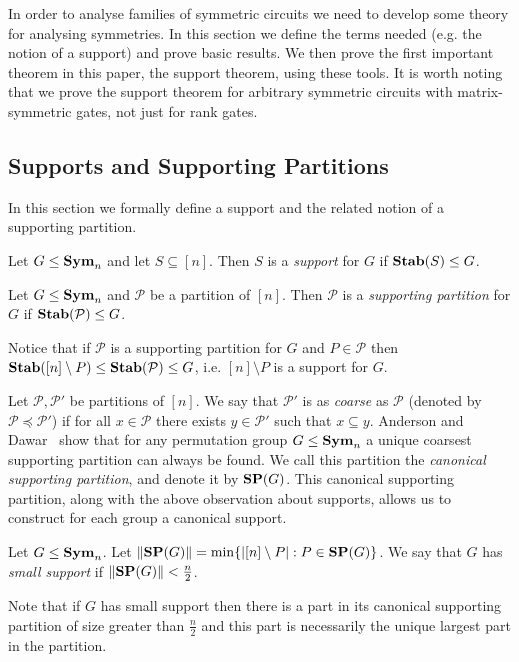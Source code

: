\documentclass[../paper.tex]{subfiles}
\begin{document}
In order to analyse families of symmetric circuits we need to develop some
theory for analysing symmetries. In this section we define the terms needed
(e.g. the notion of a support) and prove basic results. We then prove the first
important theorem in this paper, the support theorem, using these tools. It is
worth noting that we prove the support theorem for arbitrary symmetric circuits
with matrix-symmetric gates, not just for rank gates.

\subsection{Supports and Supporting Partitions}
In this section we formally define a support and the related notion of a
supporting partition.

\begin{definition}
  Let $G \leq \text{\textbf{Sym}}_n$ and let $S \subseteq [n]$. Then $S$ is a \emph{support}
  for $G$ if $\text{\textbf{Stab}}(S) \leq G$.
\end{definition}

\begin{definition}
  Let $G \leq \text{\textbf{Sym}}_n$ and $\mathcal{P}$ be a partition of $[n]$. Then
  $\mathcal{P}$ is a \emph{supporting partition} for $G$ if $\text{\textbf{Stab}}(\mathcal{P})
  \leq G$.
\end{definition}

Notice that if $\mathcal{P}$ is a supporting partition for $G$ and $P \in
\mathcal{P}$ then $\text{\textbf{Stab}}([n] \setminus P) \leq \text{\textbf{Stab}}(\mathcal{P}) \leq
G$, i.e. $[n] \setminus P$ is a support for $G$.

Let $\mathcal{P}, \mathcal{P}'$ be partitions of $[n]$.  We say that $\mathcal{P}'$ is as
\emph{coarse} as $\mathcal{P}$ (denoted by $\mathcal{P} \preceq \mathcal{P}'$)
if for all $x \in \mathcal{P}$ there exists $y \in \mathcal{P}'$ such that $x
\subseteq y$.
Anderson and Dawar~\cite{AndersonD17} show that for any permutation group $G
\leq \text{\textbf{Sym}}_n$ a unique coarsest supporting partition can always be found.  We call this
partition the \emph{canonical supporting partition}, and denote it by $\text{\textbf{SP}} (G)$.
This canonical supporting partition, along with the above observation about
supports, allows us to construct for each group a canonical support.

\begin{definition}
  Let $G \leq \text{\textbf{Sym}}_n$. Let $\| \text{\textbf{SP}}(G) \| = \min \{\vert [n] \setminus P \vert :
  P \in \text{\textbf{SP}}(G) \}$. We say that $G$ has \emph{small support} if $\| \text{\textbf{SP}}(G) \| <
  \frac{n}{2}$.
\end{definition}
Note that if $G$ has small support then there is a part in its
canonical supporting partition of size greater than $\frac{n}{2}$ and this
part is necessarily the unique largest part in the partition.
\end{document}
